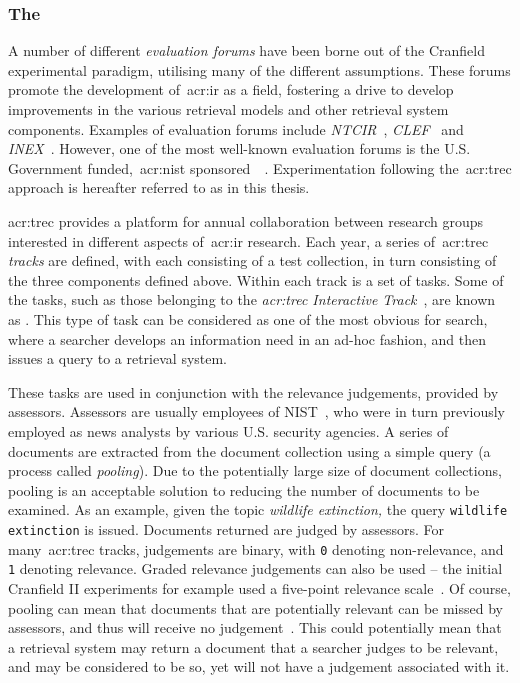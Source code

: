 \subsubsection{The~}\label{sec:ir_background:paradigms:trec}
A number of different \emph{evaluation forums} have been borne out of the Cranfield experimental paradigm, utilising many of the different assumptions. These forums promote the development of~\gls{acr:ir} as a field, fostering a drive to develop improvements in the various retrieval models and other retrieval system components. Examples of evaluation forums include \emph{NTCIR}~\citep{kando1999ntcir}, \emph{CLEF}~\citep{braschler2001clef} and \emph{INEX}~\citep{fuhr2006advances}. However, one of the most well-known evaluation forums is the U.S. Government funded,~\gls{acr:nist} sponsored~~\citep{harman1993trec1}. Experimentation following the~\gls{acr:trec} approach is hereafter referred to as  in this thesis.

\gls{acr:trec} provides a platform for annual collaboration between research groups interested in different aspects of~\gls{acr:ir} research. Each year, a series of~\gls{acr:trec} \emph{tracks} are defined, with each consisting of a test collection, in turn consisting of the three components defined above. Within each track is a set of tasks. Some of the tasks, such as those belonging to the \emph{\gls{acr:trec} Interactive Track}~\citep{over2001trec}, are known as . This type of task can be considered as one of the most obvious for search, where a searcher develops an information need in an ad-hoc fashion, and then issues a query to a retrieval system.

These tasks are used in conjunction with the relevance judgements, provided by assessors. Assessors are usually employees of NIST~\citep{robertson2008history_ir_evaluation}, who were in turn previously employed as news analysts by various U.S. security agencies. A series of documents are extracted from the document collection using a simple query (a process called \emph{pooling}). Due to the potentially large size of document collections, pooling is an acceptable solution to reducing the number of documents to be examined. As an example, given the topic \emph{wildlife extinction,} the query \texttt{wildlife extinction} is issued. Documents returned are judged by assessors. For many~\gls{acr:trec} tracks, judgements are binary, with \texttt{0} denoting non-relevance, and \texttt{1} denoting relevance. Graded relevance judgements can also be used -- the initial Cranfield II experiments for example used a five-point relevance scale~\citep{voorhees2001iir_philosophy}. Of course, pooling can mean that documents that are potentially relevant can be missed by assessors, and thus will receive no judgement~\citep{keenan2001effect}. This could potentially mean that a retrieval system may return a document that a searcher judges to be relevant, and may be considered to be so, yet will not have a judgement associated with it.

